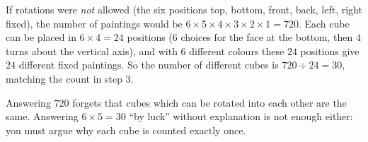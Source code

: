 {
If rotations were \emph{not} allowed (the six positions top, bottom, front, back, left, right fixed), the number of paintings would be
$6\times5\times4\times3\times2\times1=720$. Each cube can be placed in $6\times4=24$ positions ($6$ choices for the face at the bottom, then
$4$ turns about the vertical axis), and with $6$ different colours these $24$ positions give $24$ different fixed paintings.
So the number of different cubes is $720\div24=30$, matching the count in step 3.
\begin{warnbox}Answering $720$ forgets that cubes which can be rotated into each other are the same. Answering $6\times5=30$ ``by luck''
without explanation is not enough either: you must argue why each cube is counted exactly once.\end{warnbox}
}

